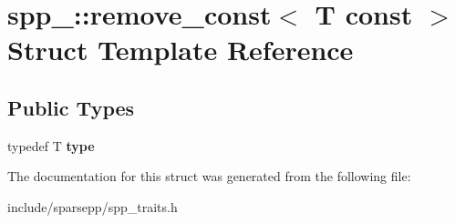 \hypertarget{structspp___1_1remove__const_3_01_t_01const_01_01_4}{}\section{spp\+\_\+\+:\+:remove\+\_\+const$<$ T const $>$ Struct Template Reference}
\label{structspp___1_1remove__const_3_01_t_01const_01_01_4}
\subsection*{Public Types}
\begin{DoxyCompactItemize}
\item 
typedef T {\bfseries type}\hypertarget{structspp___1_1remove__const_3_01_t_01const_01_01_4_ad4584fda164bc803dc4bb94a5f67e2ea}{}\label{structspp___1_1remove__const_3_01_t_01const_01_01_4_ad4584fda164bc803dc4bb94a5f67e2ea}

\end{DoxyCompactItemize}


The documentation for this struct was generated from the following file\+:\begin{DoxyCompactItemize}
\item 
include/sparsepp/spp\+\_\+traits.\+h\end{DoxyCompactItemize}
